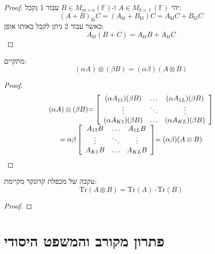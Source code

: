 \documentclass{tstextbook}
\begin{document}
\begin{proof}
יהי \(A \in M_{k\times \ell}\left( \mathbb{F}  \right)\) ו-\(B \in M_{m\times n}\left( \mathbb{F}  \right)\) עבור 1 נקבל:
$${{(A+B)_{\mathrm{{kl}}}C=(A_{\mathrm{{kl}}}+B_{\mathrm{{kl}}})C}}{{=A_{\mathrm{{kl}}}C+B_{\mathrm{{kl}}}C}}$$
כאשר עבור 2 ניתן לקבל באותו אופן:
$$A_{k l}(B+C)=A_{k l}B+A_{k l}C$$

\end{proof}
\begin{proposition}
מתקיים:
$$(\alpha A)\otimes(\beta B)=(\alpha\beta)(A\otimes B)$$

\end{proposition}
\begin{proof}
$$\begin{array}{c}{{(\alpha A)\otimes(\beta B)}} {{=\left[\begin{array}{c c c}{{(\alpha A_{11})(\beta B)}}&{{\ldots}}&{{(\alpha A_{1L})(\beta B)}}\\ {{\vdots}}&{{\ddots}}&{{\vdots}}\\ {{(\alpha A_{K1})(\beta B)}}&{{\ldots}}&{{(\alpha A_{K L})(\beta B)}}\end{array}\right]}}\\ {{=\alpha\beta\left[\begin{array}{c c c}{{A_{11}B}}&{{\ldots}}&{{A_{1L}B}}\\ {{\vdots}}&{{\ddots}}&{{\vdots}}\\ {{A_{K1}B}}&{{\ldots}}&{{A_{K L}B}}\end{array}\right]}}{{=(\alpha\beta)(A\otimes B)}}\end{array}$$

\end{proof}
\begin{proposition}
עקבה של מכפלת קרונקר מקיימת:
$$\mathrm{Tr}\left( A\otimes B \right)=\mathrm{Tr}(A)\cdot \mathrm{Tr}(B)$$

\end{proposition}
\begin{proof}
\end{proof}

\section{פתרון מקורב והמשפט היסודי}
\end{document}
